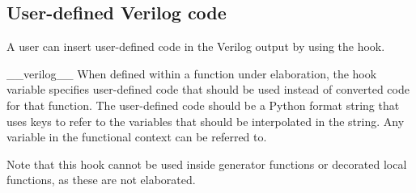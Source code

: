 \subsection{User-defined Verilog code \label{ref-conv-user}}

A user can insert user-defined code in the Verilog output
by using the  hook.

\begin{datadesc}{__verilog__}
When defined within a function under elaboration, the
 hook variable specifies user-defined code that
should be used instead of converted code for that function.  The
user-defined code should be a Python format string that uses keys to
refer to the variables that should be interpolated in the string. Any
variable in the functional context can be referred to.

Note that this hook cannot be used inside generator functions or
decorated local functions, as these are not elaborated.
\end{datadesc}

